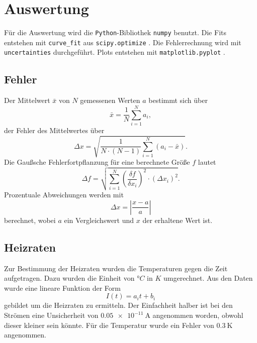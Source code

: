 \section{Auswertung}
\label{sec:Auswertung}

Für die Auswertung wird die \texttt{Python}-Bibliothek \texttt{numpy} \cite{numpy} benutzt. Die Fits entstehen mit \texttt{curve\_fit} aus \texttt{scipy.optimize} \cite{scipy}.
Die Fehlerrechnung wird mit \texttt{uncertainties} \cite{uncertainties} durchgeführt. Plots entstehen mit \texttt{matplotlib.pyplot} \cite{matplotlib}.

\subsection{Fehler}
Der Mittelwert $\bar{x}$ von $N$ gemessenen Werten $a$ bestimmt sich über
\begin{equation}
    \bar{x} = \frac{1}{N} \sum^N_{i=1} a_i,
    \label{eq:mittelwerte}
\end{equation}
der Fehler des Mittelwertes über
\begin{equation}
    \Delta x = \sqrt{\frac{1}{N \cdot (N-1)} \sum^N_{i=1}(a_i - \bar{x})}.
    \label{eq:mittelwerte_fehler}
\end{equation}
Die Gaußsche Fehlerfortpflanzung für eine berechnete Größe $f$ lautet
\begin{equation}
    \Delta f = \sqrt{ \sum^N_{i=1} \left( \frac{\delta f}{\delta x_i}\right)^2 \cdot (\Delta x_i)^2}.
\end{equation}
Prozentuale Abweichungen werden mit
\begin{equation}
    \Delta x = \left|\frac{x - a}{a}\right|
    \label{eq:abweichung}
\end{equation}
berechnet, wobei $a$ ein Vergleichswert und $x$ der erhaltene Wert ist.

\subsection{Heizraten}
Zur Bestimmung der Heizraten wurden die Temperaturen gegen die Zeit aufgetragen. Dazu wurden die
Einheit von $°C$ in $K$ umgerechnet. Aus den Daten wurde eine lineare Funktion der Form 
\begin{equation}
    I(t)= a_it+b_i 
\end{equation}
gebildet um die Heizraten zu ermitteln. Der Einfachheit halber ist bei den Strömen eine Unsicherheit
von $\qty{0.05e-11}{\ampere}$ angenommen worden, obwohl dieser kleiner sein könnte.
Für die Temperatur wurde ein Fehler von $\qty{0.3}{\kelvin}$ angenommen.

